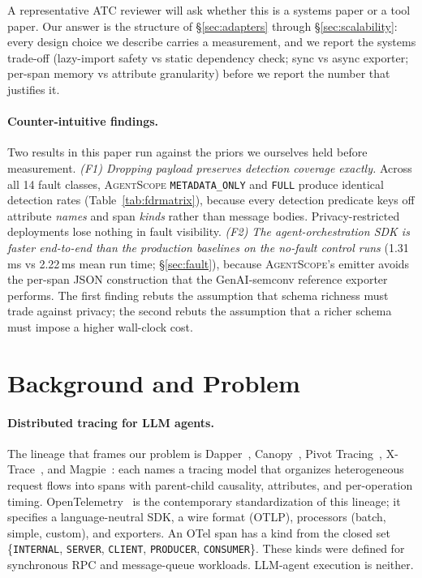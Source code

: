 \documentclass[sigplan,10pt,anonymous,review]{acmart}
\newcommand{\sysname}{\textsc{AgentScope}\xspace}
\begin{document}
A representative ATC reviewer will ask whether this is a systems paper
or a tool paper. Our answer is the structure of \S\ref{sec:adapters}
through \S\ref{sec:scalability}: every design choice we describe carries
a measurement, and we report the systems trade-off (lazy-import safety
vs static dependency check; sync vs async exporter; per-span memory vs
attribute granularity) before we report the number that justifies it.

\paragraph{Counter-intuitive findings.} Two results in this paper run
against the priors we ourselves held before measurement.
\emph{(F1) Dropping payload preserves detection coverage exactly.}
Across all 14 fault classes, \sysname{} \texttt{METADATA\_ONLY} and
\texttt{FULL} produce identical detection rates (Table~\ref{tab:fdrmatrix}),
because every detection predicate keys off attribute \emph{names} and
span \emph{kinds} rather than message bodies. Privacy-restricted
deployments lose nothing in fault visibility.
\emph{(F2) The agent-orchestration SDK is faster end-to-end than the
production baselines on the no-fault control runs} (1.31\,ms vs
2.22\,ms mean run time; \S\ref{sec:fault}), because \sysname's
emitter avoids the per-span JSON construction that the GenAI-semconv
reference exporter performs. The first finding rebuts the assumption
that schema richness must trade against privacy; the second rebuts
the assumption that a richer schema must impose a higher wall-clock
cost.

\section{Background and Problem}
\label{sec:bg}

\paragraph{Distributed tracing for LLM agents.} The lineage that frames
our problem is Dapper~\cite{dapper}, Canopy~\cite{canopy}, Pivot
Tracing~\cite{pivottracing}, X-Trace~\cite{xtrace}, and
Magpie~\cite{magpie}: each names a tracing model that organizes
heterogeneous request flows into spans with parent-child causality,
attributes, and per-operation timing. OpenTelemetry~\cite{otel} is the
contemporary standardization of this lineage; it specifies a
language-neutral SDK, a wire format (OTLP), processors (batch, simple,
custom), and exporters. An OTel span has a kind from the closed set
\{\texttt{INTERNAL}, \texttt{SERVER}, \texttt{CLIENT}, \texttt{PRODUCER},
\texttt{CONSUMER}\}. These kinds were defined for synchronous RPC and
message-queue workloads. LLM-agent execution is neither.
\end{document}
